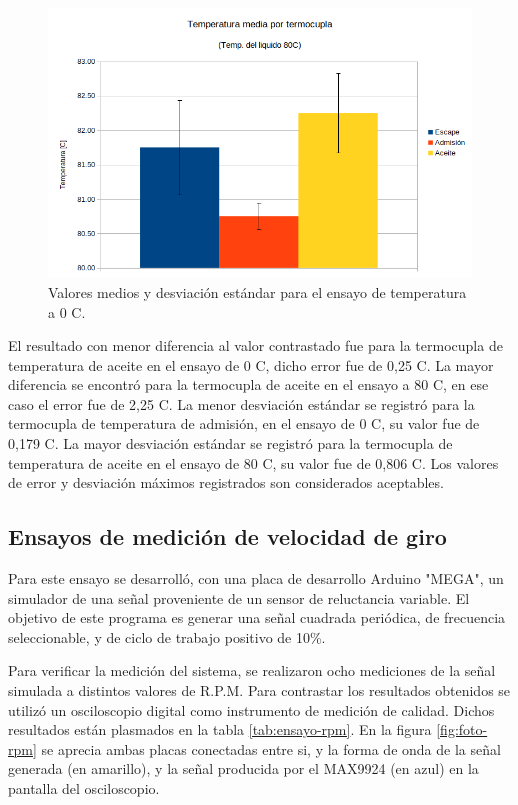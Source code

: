 \begin{figure}[htpb]
\centering
\includegraphics[width=.9\textwidth]{./Figures/temp-80c.png}
\caption{Valores medios y desviación estándar para el ensayo de temperatura a 0 \degree C.}
\label{fig:temp-80c}
\end{figure}

El resultado con menor diferencia al valor contrastado fue para la termocupla de temperatura de aceite en el ensayo de 0 \degree C, dicho error fue de 0,25 \degree C. La mayor diferencia se encontró para la termocupla de aceite en el ensayo a 80 \degree C, en ese caso el error fue de 2,25 \degree C. La menor desviación estándar se registró para la termocupla de temperatura de admisión, en el ensayo de 0 \degree C, su valor fue de 0,179 \degree C. La mayor desviación estándar se registró para la termocupla de temperatura de aceite en el ensayo de 80 \degree C, su valor fue de 0,806 \degree C.  Los valores de error y desviación máximos registrados son considerados aceptables.

\break

\subsection{Ensayos de medición de velocidad de giro}

Para este ensayo se desarrolló, con una placa de desarrollo Arduino "MEGA", un simulador de una señal proveniente de un sensor de reluctancia variable. El objetivo de este programa es generar una señal cuadrada periódica, de frecuencia seleccionable, y de ciclo de trabajo positivo de 10\%.

Para verificar la medición del sistema, se realizaron ocho mediciones de la señal simulada a distintos valores de R.P.M. Para contrastar los resultados obtenidos se utilizó un osciloscopio digital como instrumento de medición de calidad. Dichos resultados están plasmados en la tabla \ref{tab:ensayo-rpm}. En la figura \ref{fig:foto-rpm} se aprecia ambas placas conectadas entre si, y la forma de onda de la señal generada (en amarillo), y la señal producida por el MAX9924 (en azul) en la pantalla del osciloscopio.

